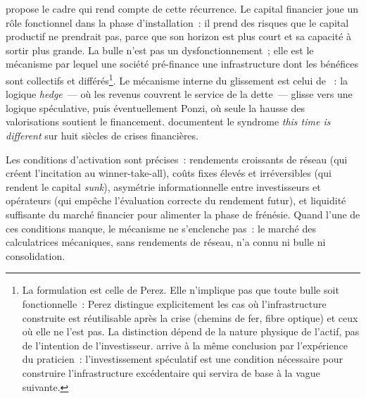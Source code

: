 \markEVO \textcite{perez_technological_2002} propose le cadre qui rend compte de cette récurrence. Le capital financier joue un rôle fonctionnel dans la phase d'installation~: il prend des risques que le capital productif ne prendrait pas, parce que son horizon est plus court et sa capacité à sortir plus grande. La bulle n'est pas un dysfonctionnement~; elle est le mécanisme par lequel une société pré-finance une infrastructure dont les bénéfices sont collectifs et différés\footnote{La formulation est celle de Perez. Elle n'implique pas que toute bulle soit fonctionnelle~: Perez distingue explicitement les cas où l'infrastructure construite est réutilisable après la crise (chemins de fer, fibre optique) et ceux où elle ne l'est pas. La distinction dépend de la nature physique de l'actif, pas de l'intention de l'investisseur. \textcite{janeway_doing_2012} arrive à la même conclusion par l'expérience du praticien~: l'investissement spéculatif est une condition nécessaire pour construire l'infrastructure excédentaire qui servira de base à la vague suivante.}. Le mécanisme interne du glissement est celui de \textcite{minsky_stabilizing_1986}~: la logique \emph{hedge}~--- où les revenus couvrent le service de la dette~--- glisse vers une logique spéculative, puis éventuellement Ponzi, où seule la hausse des valorisations soutient le financement. \textcite{reinhart_this_2009} documentent le syndrome \og \emph{this time is different}\fg{} sur huit siècles de crises financières.

Les conditions d'activation sont précises~: rendements croissants de réseau (qui créent l'incitation au winner-take-all), coûts fixes élevés et irréversibles (qui rendent le capital \emph{sunk}), asymétrie informationnelle entre investisseurs et opérateurs (qui empêche l'évaluation correcte du rendement futur), et liquidité suffisante du marché financier pour alimenter la phase de frénésie. Quand l'une de ces conditions manque, le mécanisme ne s'enclenche pas~: le marché des calculatrices mécaniques, sans rendements de réseau, n'a connu ni bulle ni consolidation.

